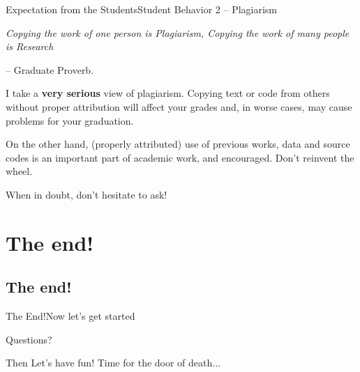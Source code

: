 \documentclass[t]{beamer}
\begin{document}
\begin{ftst}
  {Expectation from the Students}{Student Behavior 2 -- Plagiarism}

  \begin{center}
    \emph{Copying the work of one person is Plagiarism, Copying the work of many people is Research}
  \end{center}
  \hfill -- Graduate Proverb.

  \vone

  I take a {\bf very serious} view of plagiarism. Copying text or code
  from others without proper attribution will affect your grades and,
  in worse cases, may cause problems for your graduation.

  \vone

  On the other hand, (properly attributed) use of previous works, data
  and source codes is an important part of academic work, and
  encouraged. Don't reinvent the wheel.

  \vone

  \alert{When in doubt, don't hesitate to ask!}

\end{ftst}

\section{The end!}
\subsection{The end!}

\begin{ftst}
  {The End!}{Now let's get started}

  \begin{center}
    Questions?

    \vone

    Then Let's have fun! Time for the \alert{door of death...}
  \end{center}
\end{ftst}
\end{document}
